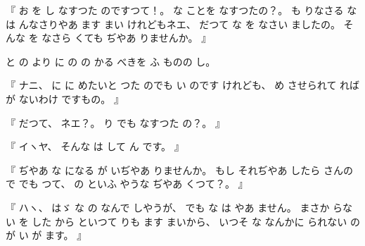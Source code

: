 %
『
お
を
し
なすつた
のですつて！。
%
な
ことを
なすつたの？。
%
も
りなさる
な
は
んなさりやあ
ます
まい
けれどもネエ、
%
だつて
な
を
なさい
ましたの。
%
そんな
を
なさら
くても
ぢやあ
りませんか。
』

%
と
の
より
に
の
の
かる
べきを
ふ
ものの
し。

%
『
ナニ、
%
に
に
めたいと
つた
のでも
い
のです
けれども、
%
め
させられて
れば
が
ないわけ
ですもの。
』

%
『
だつて、
%
ネエ？。
%
り
でも
なすつた
の？。
』

%
『
イヽヤ、
%
そんな
は
して
ん
です。
』

%
『
ぢやあ
な
になる
が
いぢやあ
りませんか。
%
もし
それぢやあ
したら
さんの
で
でも
つて、
%
の
といふ
やうな
ぢやあ
くつて？。
』

%
『
ハヽ、
%
はゞ
な
の
なんで
しやうが、
%
でも
な
は
やあ
ません。
%
まさか
らない
を
した
から
といつて
りも
ます
まいから、
%
いつそ
な
なんかに
られない
の
が
い
が
ます。
』

